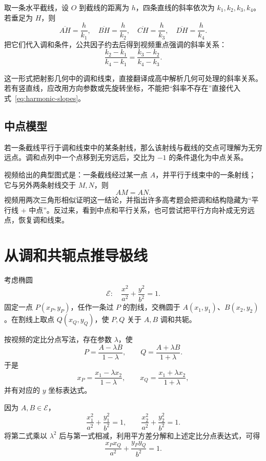 \documentclass[UTF8,11pt]{ctexart}
\newcommand{\dirseg}[2]{\overline{#1#2}}
\begin{document}
取一条水平截线，设 $O$ 到截线的距离为 $h$，四条直线的斜率依次为 $k_1,k_2,k_3,k_4$。若垂足为 $H$，则
\[
\dirseg AH=\frac{h}{k_1},\quad
\dirseg BH=\frac{h}{k_2},\quad
\dirseg CH=\frac{h}{k_3},\quad
\dirseg DH=\frac{h}{k_4}.
\]
把它们代入调和条件，公共因子约去后得到视频重点强调的斜率关系：
\begin{equation}
\label{eq:harmonic-slopes}
\boxed{
\frac{k_2-k_1}{k_4-k_1}
=\frac{k_3-k_2}{k_4-k_3}
}.
\end{equation}

这一形式把射影几何中的调和线束，直接翻译成高中解析几何可处理的斜率关系。若有竖直线，应改用方向参数或先旋转坐标，不能把“斜率不存在”直接代入式~\eqref{eq:harmonic-slopes}。

\subsection{中点模型}

若一条截线平行于调和线束中的某条射线，那么该射线与截线的交点可理解为无穷远点。调和点列中一个点移到无穷远后，交比为 $-1$ 的条件退化为中点关系。

视频给出的典型图式是：一条截线经过某一点 $A$，并平行于线束中的一条射线；它与另外两条射线交于 $M,N$，则
\[
\boxed{AM=AN}.
\]
视频用两次三角形相似证明这一结论，并指出许多高考题会把调和结构隐藏为“平行线 $+$ 中点”。反过来，看到中点和平行关系，也可尝试把平行方向补成无穷远点，恢复调和线束。

\section{从调和共轭点推导极线}

考虑椭圆
\begin{equation}
\label{eq:ellipse}
\mathcal E:\quad \frac{x^2}{a^2}+\frac{y^2}{b^2}=1.
\end{equation}
固定一点 $P(x_P,y_P)$，任作一条过 $P$ 的割线，交椭圆于
$A(x_1,y_1)$、$B(x_2,y_2)$。在割线上取点 $Q(x_Q,y_Q)$，使 $P,Q$ 关于 $A,B$ 调和共轭。

按视频的定比分点写法，存在参数 $\lambda$，使
\[
P=\frac{A-\lambda B}{1-\lambda},
\qquad
Q=\frac{A+\lambda B}{1+\lambda}.
\]
于是
\[
x_P=\frac{x_1-\lambda x_2}{1-\lambda},\qquad
x_Q=\frac{x_1+\lambda x_2}{1+\lambda},
\]
并有对应的 $y$ 坐标表达式。

因为 $A,B\in\mathcal E$，
\[
\frac{x_1^2}{a^2}+\frac{y_1^2}{b^2}=1,
\qquad
\frac{x_2^2}{a^2}+\frac{y_2^2}{b^2}=1.
\]
将第二式乘以 $\lambda^2$ 后与第一式相减，利用平方差分解和上述定比分点表达式，可得
\begin{equation}
\label{eq:polar-ellipse}
\boxed{
\frac{x_Px_Q}{a^2}+\frac{y_Py_Q}{b^2}=1
}.
\end{equation}
\end{document}
